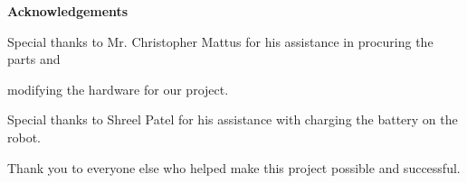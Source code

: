
\begin{center}\textbf{Acknowledgements}\end{center}

    \par Special thanks to Mr. Christopher Mattus for his assistance in procuring the parts and 
    \par modifying the hardware for our project.
    \par Special thanks to Shreel Patel for his assistance with charging the battery on the robot.
    \par Thank you to everyone else who helped make this project possible and successful.


\cleardoublepage



